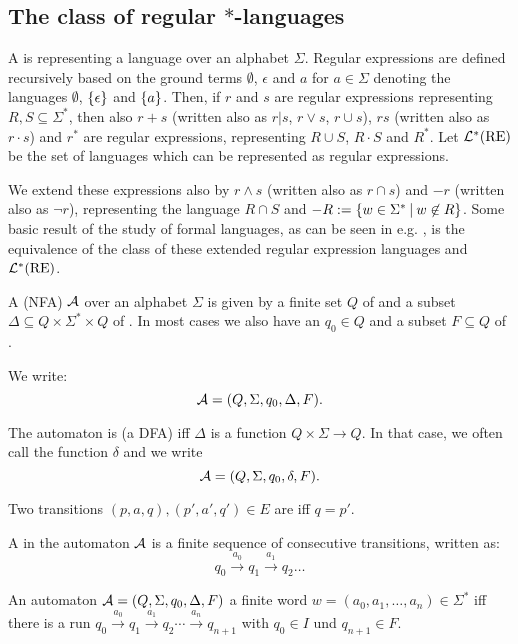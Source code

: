 \subsection{The class of regular $*$-languages}
\label{intro:reglang}

A  is representing a language over an alphabet $\Sigma$. Regular expressions are defined recursively based on the ground terms $\emptyset$, $\epsilon$ and $a$ for $a \in \Sigma$ denoting the languages $\emptyset$, $\Set{\epsilon}$ and $\Set{a}$. Then, if $r$ and $s$ are regular expressions representing $R, S \subseteq \Sigma^*$, then also $r+s$ (written also as $r|s$, $r \vee s$, $r \cup s$), $r s$ (written also as $r \cdot s$) and $r^*$ are regular expressions, representing $R \cup S$, $R \cdot S$ and $R^*$. Let $\mathcal{L}^*(\text{RE})$ be the set of languages which can be represented as regular expressions.

We extend these expressions also by $r \wedge s$ (written also as $r \cap s$) and $-r$ (written also as $\neg r$), representing the language $R \cap S$ and $-R := \Set{w \in \Sigma^*}{w \not\in R}$. Some basic result of the study of formal languages, as can be seen in e.g. \cite{FinAutLogR109}, is the equivalence of the class of these extended regular expression languages and $\mathcal{L}^*(\text{RE})$.

A   (NFA) $\mathcal{A}$ over an alphabet $\Sigma$ is given by a finite set $Q$ of  and a subset $\Delta \subseteq Q \times \Sigma^* \times Q$ of . In most cases we also have an  $q_0 \in Q$ and a subset $F \subseteq Q$ of .

We write:
\[ \mathcal{A} = (Q, \Sigma, q_0, \Delta, F). \]

The automaton is  (a DFA) iff $\Delta$ is a function $Q \times \Sigma \rightarrow Q$. In that case, we often call the function $\delta$ and we write
\[ \mathcal{A} = (Q, \Sigma, q_0, \delta, F). \]

Two transitions $(p,a,q), (p',a',q') \in E$ are  iff $q=p'$.

A  in the automaton $\mathcal{A}$ is a finite sequence of consecutive transitions, written as:
\[ q_0 \xrightarrow{a_0} q_1 \xrightarrow{a_1} q_2 \dots \]

An automaton $\mathcal{A} = (Q, \Sigma, q_0, \Delta, F)$  a finite word $w = (a_0,a_1,\dots,a_n) \in \Sigma^*$ iff there is a run $q_0 \xrightarrow{a_0} q_1 \xrightarrow{a_1} q_2 \cdots \xrightarrow{a_n} q_{n+1}$ with $q_0 \in I$ und $q_{n+1} \in F$.

